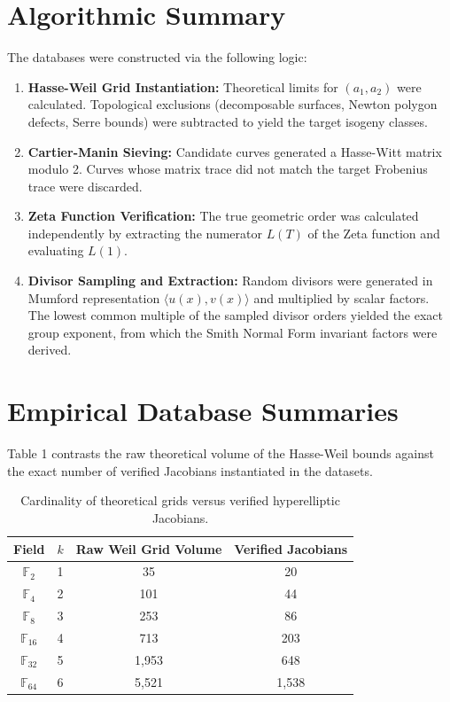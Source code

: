 \documentclass[12pt]{article}
\begin{document}
\section{Algorithmic Summary}
The databases were constructed via the following logic:
\begin{enumerate}
    \item \textbf{Hasse-Weil Grid Instantiation:} Theoretical limits for $(a_1, a_2)$ were calculated. Topological exclusions (decomposable surfaces, Newton polygon defects, Serre bounds) were subtracted to yield the target isogeny classes.
    \item \textbf{Cartier-Manin Sieving:} Candidate curves generated a Hasse-Witt matrix modulo 2. Curves whose matrix trace did not match the target Frobenius trace were discarded.
    \item \textbf{Zeta Function Verification:} The true geometric order was calculated independently by extracting the numerator $L(T)$ of the Zeta function and evaluating $L(1)$. 
    \item \textbf{Divisor Sampling and Extraction:} Random divisors were generated in Mumford representation $\langle u(x), v(x) \rangle$ and multiplied by scalar factors. The lowest common multiple of the sampled divisor orders yielded the exact group exponent, from which the Smith Normal Form invariant factors were derived. 
\end{enumerate}

\section{Empirical Database Summaries}
Table 1 contrasts the raw theoretical volume of the Hasse-Weil bounds against the exact number of verified Jacobians instantiated in the datasets.

\begin{table}[h!]
\centering
\begin{tabular}{cccc}
\toprule
Field & $k$ & Raw Weil Grid Volume & Verified Jacobians \\
\midrule
$\mathbb{F}_2$ & 1 & 35 & 20 \\
$\mathbb{F}_4$ & 2 & 101 & 44 \\
$\mathbb{F}_8$ & 3 & 253 & 86 \\
$\mathbb{F}_{16}$ & 4 & 713 & 203 \\
$\mathbb{F}_{32}$ & 5 & 1,953 & 648 \\
$\mathbb{F}_{64}$ & 6 & 5,521 & 1,538 \\
\bottomrule
\end{tabular}
\caption{Cardinality of theoretical grids versus verified hyperelliptic Jacobians.}
\end{table}
\end{document}
